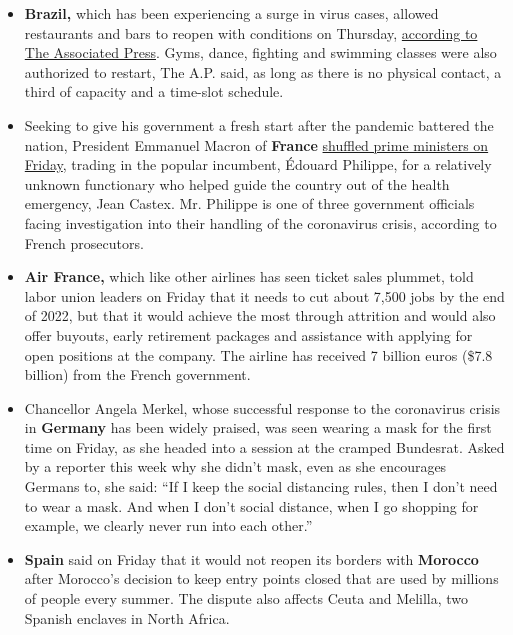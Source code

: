\begin{itemize}
\item
  \textbf{Brazil,} which has been experiencing a surge in virus cases,
  allowed restaurants and bars to reopen with conditions on Thursday,
  \href{https://www.republicworld.com/world-news/south-america/restrictions-on-rio-restaurants-and-bars-eased.html}{according
  to The Associated Press}. Gyms, dance, fighting and swimming classes
  were also authorized to restart, The A.P. said, as long as there is no
  physical contact, a third of capacity and a time-slot schedule.
\item
  Seeking to give his government a fresh start after the pandemic
  battered the nation, President Emmanuel Macron of \textbf{France}
  \href{https://www.nytimes3xbfgragh.onion/2020/07/03/world/europe/france-prime-minister-resign.html}{shuffled
  prime ministers on Friday}, trading in the popular incumbent, Édouard
  Philippe, for a relatively unknown functionary who helped guide the
  country out of the health emergency, Jean Castex. Mr. Philippe is one
  of three government officials facing investigation into their handling
  of the coronavirus crisis, according to French prosecutors.
\item
  \textbf{Air France,} which like other airlines has seen ticket sales
  plummet, told labor union leaders on Friday that it needs to cut about
  7,500 jobs by the end of 2022, but that it would achieve the most
  through attrition and would also offer buyouts, early retirement
  packages and assistance with applying for open positions at the
  company. The airline has received 7 billion euros (\$7.8 billion) from
  the French government.
\item
  Chancellor Angela Merkel, whose successful response to the coronavirus
  crisis in \textbf{Germany} has been widely praised, was seen wearing a
  mask for the first time on Friday, as she headed into a session at the
  cramped Bundesrat. Asked by a reporter this week why she didn't mask,
  even as she encourages Germans to, she said: ``If I keep the social
  distancing rules, then I don't need to wear a mask. And when I don't
  social distance, when I go shopping for example, we clearly never run
  into each other.''
\item
  \textbf{Spain} said on Friday that it would not reopen its borders
  with \textbf{Morocco} after Morocco's decision to keep entry points
  closed that are used by millions of people every summer. The dispute
  also affects Ceuta and Melilla, two Spanish enclaves in North Africa.

\end{itemize}

